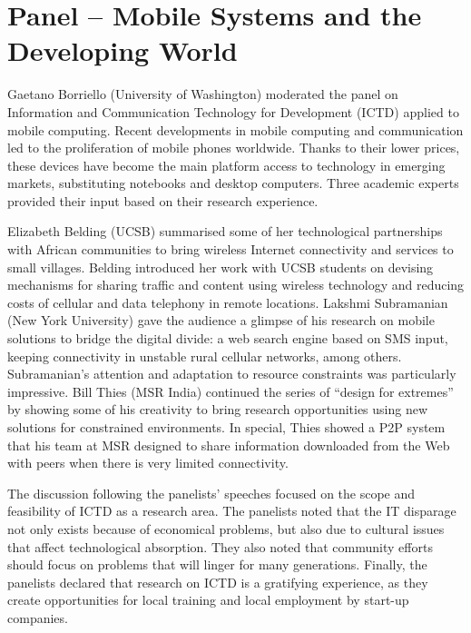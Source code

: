 \section{Panel -- Mobile Systems and the Developing World}
\label{sec:panel}

Gaetano Borriello (University of Washington) moderated the panel on
Information and Communication Technology for Development (ICTD) applied
to mobile computing. Recent developments in mobile computing and
communication led to the proliferation of mobile phones worldwide.
Thanks to their lower prices, these devices have become the main
platform access to technology in emerging markets, substituting
notebooks and desktop computers. Three academic experts provided their
input based on their research experience.

Elizabeth Belding (UCSB) summarised some of her technological
partnerships with African communities to bring wireless Internet
connectivity and services to small villages. Belding introduced her work
with UCSB students on devising mechanisms for sharing traffic and
content using wireless technology and reducing costs of cellular and
data telephony in remote locations. Lakshmi Subramanian (New York
University) gave the audience a glimpse of his research on mobile
solutions to bridge the digital divide: a web search engine based on SMS
input, keeping connectivity in unstable rural cellular networks, among
others. Subramanian's attention and adaptation to
resource constraints was particularly impressive.
Bill Thies (MSR India) continued the series of
``design for extremes'' by showing some of his creativity to bring
research opportunities using new solutions for constrained environments.
In special, Thies showed a P2P system that his team at MSR designed to
share information downloaded from the Web with peers when there is very
limited connectivity.

The discussion following the panelists' speeches focused on the scope
and feasibility of ICTD as a research area. The panelists noted that the
IT disparage not only exists because of economical problems, but
also due to cultural issues that affect technological absorption. They
also noted that community efforts should focus on problems that will
linger for many generations. Finally, the panelists declared that
research on ICTD is a gratifying experience, as they create
opportunities for local training and local employment by start-up
companies.
